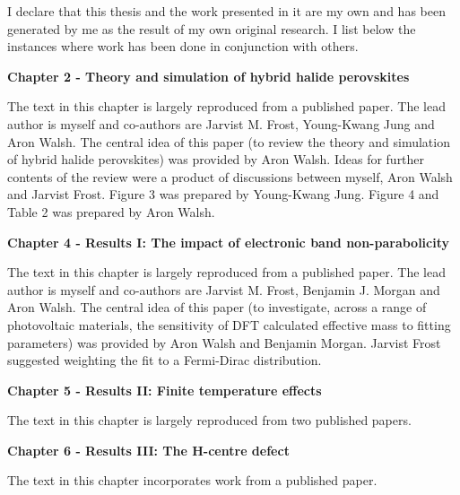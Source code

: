 I declare that this thesis and the work presented in it are my own and has been generated by me as the result of my own original research. I list below the instances where work has been done in conjunction with others.
\vspace{\frontmatterbaselineskip}

\textbf{Chapter 2 - Theory and simulation of hybrid halide perovskites } 

The text in this chapter is largely reproduced from a published paper.\autocite{Whalley2017} The lead author is myself and co-authors are Jarvist M. Frost, Young-Kwang Jung and Aron Walsh.
The central idea of this paper (to review the theory and simulation of hybrid halide perovskites) was provided by Aron Walsh. Ideas for further contents of the review were a product of discussions between myself, Aron Walsh and Jarvist Frost. Figure 3 was prepared by Young-Kwang Jung. Figure 4 and Table 2 was prepared by Aron Walsh. 

\vspace{\frontmatterbaselineskip}

\textbf{Chapter 4  - Results I: The impact of electronic band non-parabolicity}

The text in this chapter is largely reproduced from a published paper.\autocite{Whalley2019} The lead author is myself and co-authors are Jarvist M. Frost, Benjamin J. Morgan and Aron Walsh. The central idea of this paper (to investigate, across a range of photovoltaic materials, the sensitivity of DFT calculated effective mass to fitting parameters) was provided by Aron Walsh and Benjamin Morgan. Jarvist Frost suggested weighting the fit to a Fermi-Dirac distribution. 

\vspace{\frontmatterbaselineskip}

\textbf{Chapter 5  - Results II: Finite temperature effects}

The text in this chapter is largely reproduced from two published papers.
\vspace{\frontmatterbaselineskip}

\textbf{Chapter 6  - Results III: The H-centre defect}

The text in this chapter incorporates work from a published paper.